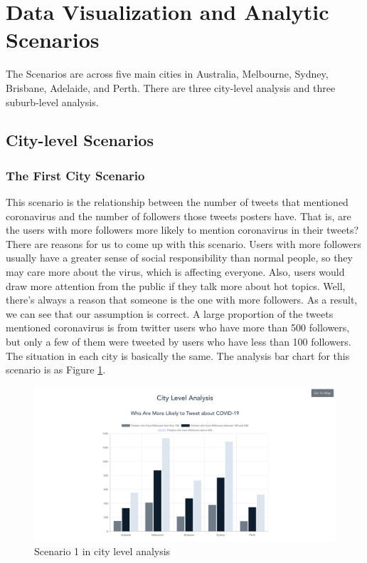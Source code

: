 \documentclass{article}
\begin{document}
\section{Data Visualization and Analytic Scenarios}
The Scenarios are across five main cities in Australia, Melbourne, Sydney, Brisbane, Adelaide, and Perth. There are three city-level analysis and three suburb-level analysis.
\subsection{City-level Scenarios}
\subsubsection{The First City Scenario}

This scenario is the relationship between the number of tweets that mentioned coronavirus and the number of followers those tweets posters have. That is, are the users with more followers more likely to mention coronavirus in their tweets? There are reasons for us to come up with this scenario. Users with more followers usually have a greater sense of social responsibility than normal people, so they may care more about the virus, which is affecting everyone. Also, users would draw more attention from the public if they talk more about hot topics. Well, there’s always a reason that someone is the one with more followers. As a result, we can see that our assumption is correct. A large proportion of the tweets mentioned coronavirus is from twitter users who have more than 500 followers, but only a few of them were tweeted by users who have less than 100 followers. The situation in each city is basically the same. The analysis bar chart for this scenario is as Figure
\ref{fig:Covid-19}. 

\begin{figure}[htp]
\centering
\includegraphics[width=\textwidth]{img/Covid-19.png}
\caption{Scenario 1 in city level analysis}
\label{fig:Covid-19}
\end{figure}
\end{document}
